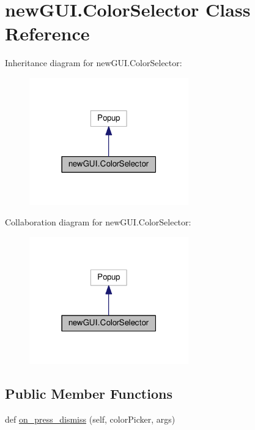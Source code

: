 \hypertarget{classnewGUI_1_1ColorSelector}{}\section{new\+G\+U\+I.\+Color\+Selector Class Reference}
\label{classnewGUI_1_1ColorSelector}


Inheritance diagram for new\+G\+U\+I.\+Color\+Selector\+:\nopagebreak
\begin{figure}[H]
\begin{center}
\leavevmode
\includegraphics[width=195pt]{classnewGUI_1_1ColorSelector__inherit__graph}
\end{center}
\end{figure}


Collaboration diagram for new\+G\+U\+I.\+Color\+Selector\+:\nopagebreak
\begin{figure}[H]
\begin{center}
\leavevmode
\includegraphics[width=195pt]{classnewGUI_1_1ColorSelector__coll__graph}
\end{center}
\end{figure}
\subsection*{Public Member Functions}
\begin{DoxyCompactItemize}
\item 
def \hyperlink{classnewGUI_1_1ColorSelector_a273d922b2792916abc4be0761209bc94}{on\+\_\+press\+\_\+dismiss} (self, color\+Picker, args)
\end{DoxyCompactItemize}
